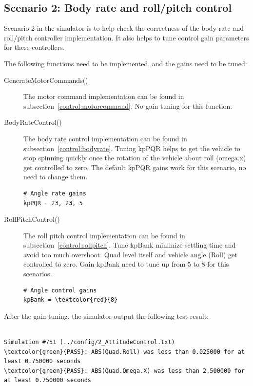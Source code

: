 \documentclass[letterpaper]{article}
\begin{document}
\subsection{Scenario 2: Body rate and roll/pitch control}

Scenario 2 in the simulator is to help check the correctness of the body rate and roll/pitch controller implementation. It also helps to tune control gain parameters for these controllers.

The following functions need to be implemented, and the gains need to be tuned: 
\begin{description}

\item [GenerateMotorCommands()] The motor command implementation can be found in subsection~\ref{control:motorcommand}. No gain tuning for this function.

\item [BodyRateControl()] The body rate control implementation can be found in subsection~\ref{control:bodyrate}. Tuning kpPQR helps to get the vehicle to stop spinning quickly once the rotation of the vehicle about roll (omega.x) get controlled to zero. The default kpPQR gains work for this scenario, no need to change them.
\begin{Verbatim}[frame=single]
# Angle rate gains
kpPQR = 23, 23, 5
\end{Verbatim} 

\item [RollPitchControl()] The roll pitch control implementation can be found in subsection~\ref{control:rollpitch}. Tune kpBank minimize settling time and avoid too much overshoot. Quad level itself and vehicle angle (Roll) get controlled to zero. Gain kpBank need to tune up from 5 to 8 for this scenarios.
\begin{Verbatim}[frame=single,commandchars=\\\{\}]
# Angle control gains
kpBank = \textcolor{red}{8}
\end{Verbatim} 

\end{description}

After the gain tuning, the simulator output the following test result:
\begin{Verbatim}[frame=lines, label=Simulator Test Result Output, commandchars=\\\{\}]

Simulation #751 (../config/2_AttitudeControl.txt)
\textcolor{green}{PASS}: ABS(Quad.Roll) was less than 0.025000 for at least 0.750000 seconds
\textcolor{green}{PASS}: ABS(Quad.Omega.X) was less than 2.500000 for at least 0.750000 seconds
\end{Verbatim} 
\end{document}
